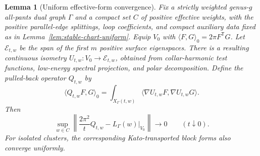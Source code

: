 \documentclass[11pt,reqno]{amsart}
\newtheorem{lemma}[theorem]{Lemma}
\theoremstyle{definition}
\theoremstyle{remark}
\begin{document}
\begin{lemma}[Uniform effective-form convergence]
\label{lem:effective-forms}
Fix a strictly weighted genus-$g$ all-pants dual graph $\Gamma$ and a compact
set $C$ of positive effective weights, with the positive parallel-edge
splittings, loop coefficients, and compact auxiliary data fixed as in
Lemma~\ref{lem:stable-chart-uniform}.  Equip $V_0$ with
$\langle F,G\rangle_0=2\pi F^{\mathsf T}G$.  Let
$\mathcal E_{t,w}$ be the span of the first $m$ positive surface eigenspaces.
There is a resulting continuous isometry
$U_{t,w}:V_0\to\mathcal E_{t,w}$, obtained from collar-harmonic test
functions, low-energy spectral projection, and polar decomposition.  Define
the pulled-back operator $Q_{t,w}$ by
\[
 \langle Q_{t,w}F,G\rangle_0
 =\int_{X_\Gamma(t,w)}
   \langle\nabla U_{t,w}F,\nabla U_{t,w}G\rangle.
\]
Then
\begin{equation}\label{eq:effective-form-limit}
 \sup_{w\in C}
 \left\|\frac{2\pi^2}{t}Q_{t,w}
       -L_\Gamma(w)|_{V_0}\right\|\longrightarrow0
 \qquad(t\downarrow0).
\end{equation}
For isolated clusters, the corresponding Kato-transported block forms also
converge uniformly.
\end{lemma}
\end{document}
